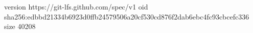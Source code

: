 version https://git-lfs.github.com/spec/v1
oid sha256:edbbd21334b6923d0ffb24579506a20cf530cd876f2dab6ebc4fc93cbcefc336
size 40208
